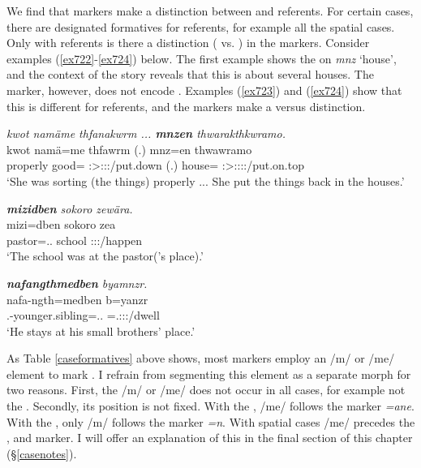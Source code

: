 We find that  markers make a distinction between  and  referents. For certain cases, there are designated formatives for  referents, for example all the spatial cases. Only with  referents is there a  distinction (\Sg{} vs. \Nsg{}) in the  markers. Consider examples (\ref{ex722}-\ref{ex724}) below. The first example shows the   on \emph{mnz} `house', and the context of the story reveals that this is about several houses. The  marker, however, does not encode . Examples (\ref{ex723}) and (\ref{ex724}) show that this is different for  referents, and the  markers make a  versus  distinction.

\begin{exe}
	\ex \emph{kwot namäme thfanakwrm ... \textbf{mnzen} thwarakthkwramo.}\\
	\gll kwot namä=me thfawrm (.) mnz=en thwawramo\\
	properly good=\Ins{} \Stsg:\Sbj>\Stpl:\Obj:\Pst:\Dur/put.down (.) house=\Loc{} \Stsg:\Sbj>\Stpl:\Io:\Pst:\Dur:\Andat/put.on.top\\ 
	\trans `She was sorting (the things) properly ... She put the things back in the houses.'
	\label{ex722}
\end{exe}
\begin{exe}
	\ex \emph{\textbf{mizidben} sokoro zewära.}\\
	\gll mizi=dben sokoro zea\\
	pastor=\Loc.\Anim.\Sg{} school \Sg:\Sbj:\Pst:\Pfv/happen\\
	\trans `The school was at the pastor('s place).'
	\label{ex723}
\end{exe}	
\begin{exe}
	\ex \emph{\textbf{nafangthmedben} byamnzr.}\\
	\gll nafa-ngth=medben b=yanzr\\
	\Third.\Poss-younger.sibling=\Loc.\Anim.\Nsg{} \Med=\Tsg.\Masc:\Sbj:\Nonpast:\Ipfv/dwell\\
	\trans `He stays at his small brothers' place.'
	\label{ex724}
\end{exe}
		
As Table \ref{caseformatives} above shows, most  markers employ an /m/ or /me/ element to mark  . I refrain from segmenting this element as a separate morph for two reasons. First, the /m/ or /me/ does not occur in all cases, for example not the  . Secondly, its position is not fixed. With the , /me/ follows the  marker \emph{=ane}. With the , only /m/ follows the  marker \emph{=n}. With spatial cases /me/ precedes the ,  and  marker. I will offer an explanation of this in the final section of this chapter (\S{}\ref{casenotes}).\\

